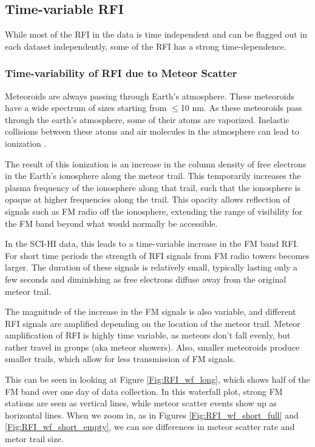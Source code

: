 \subsection{Time-variable RFI}

While most of the RFI in the data is time independent and can be flagged out in each dataset independently, some of the RFI has a strong time-dependence. 

\subsubsection{Time-variability of RFI due to Meteor Scatter}

Meteoroids are always passing through Earth's atmosphere. These meteoroids have a wide spectrum of sizes starting from $\leq$10 nm. As these meteoroids pass through the earth's atmosphere, some of their atoms are vaporized. Inelastic collisions between these atoms and air molecules in the atmosphere can lead to ionization \cite{meteor_review}. 

The result of this ionization is an increase in the column density of free electrons  in the Earth's ionosphere along the meteor trail. This temporarily increases the plasma frequency of the ionosphere along that trail, such that the ionosphere is opaque at higher frequencies along the trail. This opacity allows reflection of signals such as FM radio off the ionosphere, extending the range of visibility for the FM band beyond what would normally be accessible.

In the SCI-HI data, this leads to a time-variable increase in the FM band RFI. For short time periods the strength of RFI signals from FM radio towers becomes larger. The duration of these signals is relatively small, typically lasting only a few seconds and diminishing as free electrons diffuse away from the original meteor trail. 

The magnitude of the increase in the FM signals is also variable, and different RFI signals are amplified depending on the location of the meteor trail. Meteor amplification of RFI is highly time variable, as meteors don't fall evenly, but rather travel in groups (aka meteor showers). Also, smaller meteoroids produce smaller trails, which allow for less transmission of FM signals.

This can be seen in looking at Figure \ref{Fig:RFI_wf_long}, which shows half of the FM band over one day of data collection. In this waterfall plot, strong FM stations are seen as vertical lines, while meteor scatter events show up as horizontal lines. When we zoom in, as in Figures \ref{Fig:RFI_wf_short_full} and \ref{Fig:RFI_wf_short_empty}, we can see differences in meteor scatter rate and metor trail size.

